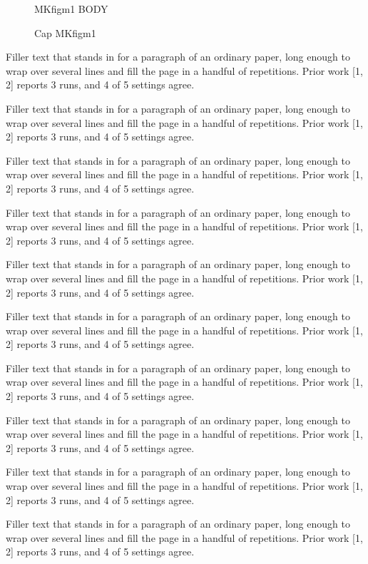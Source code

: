 \documentclass{article}
\begin{document}
\begin{figure}[t]\centering MKfigm1 BODY\caption{Cap MKfigm1}\label{fig:m1}\end{figure}
Filler text that stands in for a paragraph of an ordinary paper, long enough to wrap over several lines and fill the page in a handful of repetitions. Prior work [1, 2] reports 3 runs, and 4 of 5 settings agree.\par
Filler text that stands in for a paragraph of an ordinary paper, long enough to wrap over several lines and fill the page in a handful of repetitions. Prior work [1, 2] reports 3 runs, and 4 of 5 settings agree.\par
Filler text that stands in for a paragraph of an ordinary paper, long enough to wrap over several lines and fill the page in a handful of repetitions. Prior work [1, 2] reports 3 runs, and 4 of 5 settings agree.\par
Filler text that stands in for a paragraph of an ordinary paper, long enough to wrap over several lines and fill the page in a handful of repetitions. Prior work [1, 2] reports 3 runs, and 4 of 5 settings agree.\par
Filler text that stands in for a paragraph of an ordinary paper, long enough to wrap over several lines and fill the page in a handful of repetitions. Prior work [1, 2] reports 3 runs, and 4 of 5 settings agree.\par
Filler text that stands in for a paragraph of an ordinary paper, long enough to wrap over several lines and fill the page in a handful of repetitions. Prior work [1, 2] reports 3 runs, and 4 of 5 settings agree.\par
Filler text that stands in for a paragraph of an ordinary paper, long enough to wrap over several lines and fill the page in a handful of repetitions. Prior work [1, 2] reports 3 runs, and 4 of 5 settings agree.\par
Filler text that stands in for a paragraph of an ordinary paper, long enough to wrap over several lines and fill the page in a handful of repetitions. Prior work [1, 2] reports 3 runs, and 4 of 5 settings agree.\par
Filler text that stands in for a paragraph of an ordinary paper, long enough to wrap over several lines and fill the page in a handful of repetitions. Prior work [1, 2] reports 3 runs, and 4 of 5 settings agree.\par
Filler text that stands in for a paragraph of an ordinary paper, long enough to wrap over several lines and fill the page in a handful of repetitions. Prior work [1, 2] reports 3 runs, and 4 of 5 settings agree.\par
\end{document}
